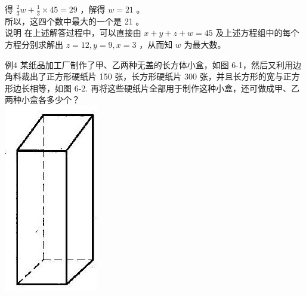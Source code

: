 \documentclass[10pt]{article}
\begin{document}
得 $\frac{2}{3} w+\frac{1}{3} \times 45=29$ ，解得 $w=21$ 。\\
所以，这四个数中最大的一个是 21 。\\
说明 在上述解答过程中，可以直接由 $x+y+z+w=45$ 及上述方程组中的每个方程分别求解出 $z=12, y=9, x=3$ ，从而知 $w$ 为最大数。

例4 某纸品加工厂制作了甲、乙两种无盖的长方体小盒，如图 6-1，然后又利用边角料裁出了正方形硬纸片 150 张，长方形硬纸片 300 张，并且长方形的宽与正方形边长相等，如图 6-2. 再将这些硬纸片全部用于制作这种小盒，还可做成甲、乙两种小盒各多少个？\\
\includegraphics[max width=\textwidth, center]{2024_10_30_26b590fd1106d28139f0g-034(1)}
\end{document}
